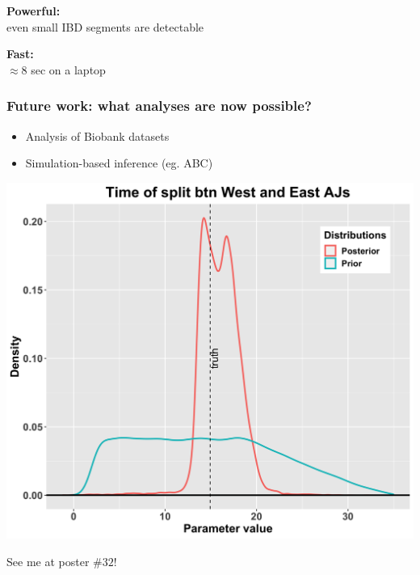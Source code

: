 \documentclass[11pt, mathserif, aspectratio=169]{beamer}
\newenvironment{wideitemize}{\itemize\addtolength{\itemsep}{10pt}}{\enditemize}
\begin{document}
\begin{frame}
\begin{minipage}{.75\linewidth}
\end{minipage}\begin{minipage}{.3\linewidth}
\begin{center}
{\small
\begin{wideitemize}
\item {\bf Powerful:}\\ even small IBD segments are detectable
\item {\bf Fast:}\\ $\approx 8$ sec on a laptop
\end{wideitemize}
}
\end{center}
\end{minipage}

\end{frame}

\begin{frame}
\frametitle{Future work: what analyses are now possible?}
\begin{minipage}{.55\linewidth}
\flushleft
\begin{center}
{\small
\begin{itemize}
\item Analysis of Biobank datasets
\item Simulation-based inference (eg. ABC)\\
\end{itemize}
}
\vspace{5mm}
\includegraphics[scale=.06]{pics/abc-ibd-4.png}
\end{center}
\end{minipage}\begin{minipage}{.4\linewidth}
\centering
See me at poster $\# 32$!


\end{minipage}
\end{frame}
\end{document}

